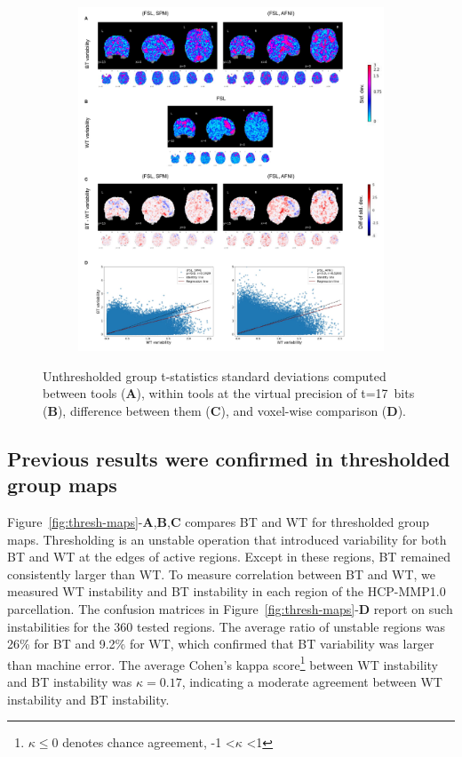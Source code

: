 \documentclass[11pt,onecolumn]{article}
\begin{document}
  \begin{figure}[ht]
      \begin{subfigure}[ht]{\textwidth}
        \centering
        \includegraphics[width=.75\textwidth]{figures/bg_global_precision.pdf}
        \end{subfigure}
        \caption{Unthresholded group t-statistics standard deviations computed between tools (\textbf{A}),
          within tools at the virtual precision of t=17~bits (\textbf{B}), difference between them (\textbf{C}), and 
          voxel-wise comparison (\textbf{D}).}
    \label{fig:gnp-mni}
  \end{figure}


  \subsection{Previous results were confirmed in thresholded group maps}

  Figure~\ref{fig:thresh-maps}-\textbf{A},\textbf{B},\textbf{C} compares BT
  and WT for thresholded group maps. Thresholding is an unstable operation
  that introduced variability for both BT and WT at the edges of
  active regions. Except in these regions, BT remained consistently larger
  than WT. To measure correlation between BT and WT, we
  measured WT instability and BT instability in each region of the
  HCP-MMP1.0 parcellation. The confusion matrices in
  Figure~\ref{fig:thresh-maps}-\textbf{D} report on such instabilities for
  the 360 tested regions. The average ratio of unstable regions was 26\%
  for BT and 9.2\% for WT, which confirmed that BT variability was larger than machine error.
  The average Cohen's kappa score\footnote{$\kappa \leq 0$ denotes chance agreement, -1 \textless $\kappa$ \textless 1} between WT instability and BT instability was $\kappa=0.17$, indicating 
  a moderate agreement between WT instability and BT instability.
\end{document}
